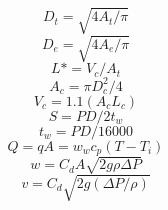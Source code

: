 \begin{equation}
D_{t} = \sqrt{4 A_{t} / \pi}
\end{equation}
\begin{equation}
D_{e} = \sqrt{4 A_{e} / \pi}
\end{equation}
\begin{equation}
L* = V_{c}/A_{t}
\end{equation}
\begin{equation}
A_{c} = \pi D_{c}^{2}/4
\end{equation}
\begin{equation}
V_{c} = 1.1(A_{c}L_{c})
\end{equation}
\begin{equation}
S = PD/2t_{w}
\end{equation}
\begin{equation}
t_{w} = PD/16000
\end{equation}
\begin{equation}
Q = q A = w_{w} c_{p} (T-T_{i})
\end{equation}
\begin{equation}
w = C_{d} A \sqrt{2 g \rho \Delta P}
\end{equation}
\begin{equation}
v = C_{d} \sqrt{2 g (\Delta P/\rho)}
\end{equation}






